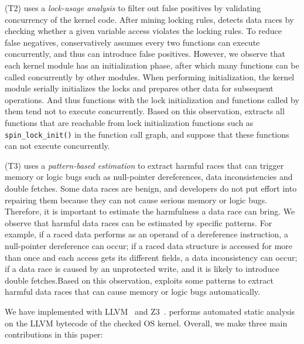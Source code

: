 (T2) \sys uses a {\em lock-usage analysis} to filter out false positives by 
validating concurrency of the kernel code. After mining locking rules, \sys 
detects data races by checking whether a given variable access violates the 
locking rules. To reduce false negatives, \sys conservatively assumes every two 
functions can execute concurrently, and thus can introduce false positives. 
However, we observe that each kernel module has an initialization phase, after 
which many functions can be called concurrently by other modules. When 
performing initialization, the kernel module serially initializes the locks and 
prepares other data for subsequent operations. And thus functions with the lock 
initialization and functions called by them tend not to execute concurrently. 
Based on this observation, \sys extracts all functions that are reachable from 
lock initialization functions such as {\tt spin\_lock\_init()} in the function 
call graph, and suppose that these functions can not execute concurrently.

(T3) \sys uses a {\em pattern-based estimation} to extract harmful races that 
can trigger memory or logic bugs such as null-pointer dereferences, data 
inconsistencies and double fetches. Some data races are benign, and developers 
do not put effort into repairing them because they can not cause serious memory 
or logic bugs. Therefore, it is important to estimate the harmfulness a data 
race can bring. We observe that harmful data races can be estimated by specific 
patterns. For example, if a raced data performs as an operand of a dereference 
instruction, a null-pointer dereference can occur; if a raced data structure is 
accessed for more than once and each access gets its different fields, a data 
inconsistency can occur; if a data race is caused by an unprotected write, and 
it is likely to introduce double fetches.Based on this observation, \sys 
exploits some patterns to extract harmful data races that can cause memory or 
logic bugs automatically.

We have implemented \sys with LLVM~\cite{clang} and Z3~\cite{z3}. 
\sys performs automated static analysis on the LLVM bytecode of the 
checked OS kernel. Overall, we make three main contributions in this paper:

